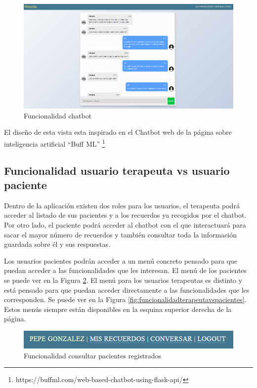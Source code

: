 \begin{figure}[h]
	\centering
	\includegraphics[scale=0.4]{Imagenes/Vectorial/funcionalidad_chatbot}
	\caption{Funcionalidad chatbot}
	\label{fig:funcionalidadchatbot}
\end{figure}

El diseño de esta vista esta inspirado en el Chatbot web de la página sobre inteligencia artificial ``Buff ML'' \footnote{https://buffml.com/web-based-chatbot-using-flask-api/}

\subsection{Funcionalidad usuario terapeuta vs usuario paciente}

Dentro de la aplicación existen dos roles para los usuarios, el terapeuta podrá acceder al listado de sus pacientes y a los recuerdos ya recogidos por el chatbot. Por otro lado, el paciente podrá acceder al chatbot con el que interactuará para sacar el mayor número de recuerdos y también consultar toda la información guardada sobre él y sus respuestas.

Los usuarios pacientes podrán acceder a un menú concreto pensado para que puedan acceder a las funcionalidades que les interesan. El menú de los pacientes se puede ver en la Figura \ref{fig:funcionalidad_terapeutavspaciente2}. El menú para los usuarios terapeutas es distinto y está pensado para que puedan acceder directamente a las funcionalidades que les corresponden. Se puede ver en la Figura \ref{fig:funcionalidadterapeutavspacientes}. Estos menús siempre están disponibles en la esquina superior derecha de la página.

\begin{figure}[h]
	\centering
	\includegraphics[scale=1.0]{Imagenes/Vectorial/funcionalidad_terapeutavspaciente2}
	\caption{Funcionalidad consultar pacientes registrados}
	\label{fig:funcionalidad_terapeutavspaciente2}
\end{figure}

